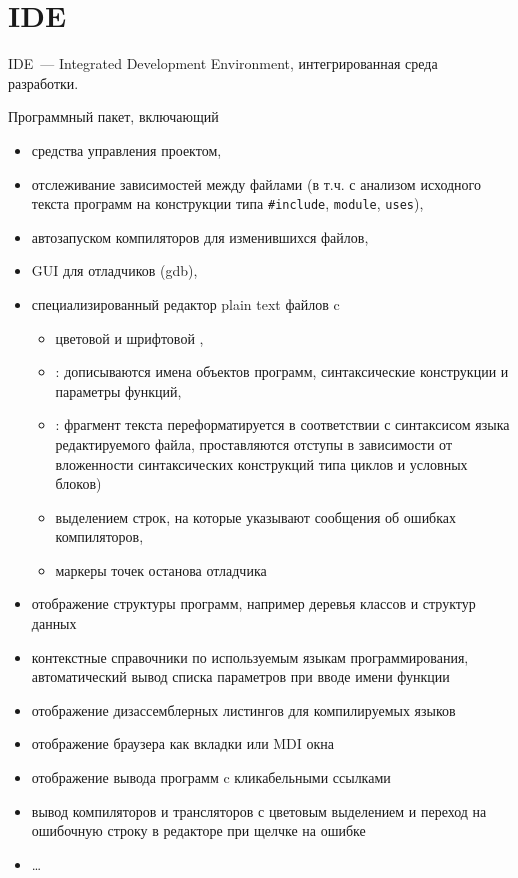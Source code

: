\part{IDE}

IDE\ --- Integrated Development Environment, интегрированная среда разработки.

Программный пакет, включающий 
\begin{itemize}
  \item средства управления проектом,
  \item отслеживание зависимостей между файлами (в т.ч. с анализом исходного
  текста программ на конструкции типа \verb|#include|, \verb|module|,
  \verb|uses|),
  \item автозапуском компиляторов для изменившихся файлов,
  \item GUI для отладчиков (gdb),
  \item специализированный редактор plain text
  файлов c
  \begin{itemize}
    \item цветовой и шрифтовой ,
  	\item {}: дописываются имена объектов программ, 
  	синтаксические конструкции и параметры функций,
 \item {}: фрагмент текста переформатируется в
 соответствии с синтаксисом языка редактируемого файла, проставляются отступы в
 зависимости от вложенности синтаксических конструкций типа циклов и условных
 блоков)
  	\item выделением строк, на которые указывают сообщения об ошибках
  	компиляторов,
  	\item маркеры точек останова отладчика
  \end{itemize}
  \item отображение структуры программ, например деревья классов и структур
  данных
  \item контекстные справочники по используемым языкам программирования,
  автоматический вывод списка параметров при вводе имени функции
  \item отображение дизассемблерных листингов для компилируемых языков
  \item отображение браузера как вкладки или MDI окна
  \item отображение вывода  программ c
  кликабельными ссылками
  \item вывод компиляторов и трансляторов с цветовым выделением и переход на
  ошибочную строку в редакторе при щелчке на ошибке
  \item \ldots
\end{itemize}

